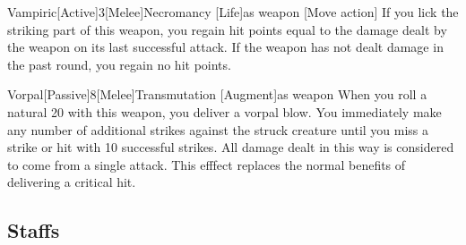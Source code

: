         \begin{magicitemdef}{Vampiric}[Active]{3}[Melee]{Necromancy [Life]}{as weapon}
            [Move action] If you lick the striking part of this weapon, you regain hit points equal to the damage dealt by the weapon on its last successful attack.
            If the weapon has not dealt damage in the past round, you regain no hit points.
        \end{magicitemdef}

        \begin{magicitemdef}{Vorpal}[Passive]{8}[Melee]{Transmutation [Augment]}{as weapon}
             When you roll a natural 20 with this weapon, you deliver a vorpal blow.
            You immediately make any number of additional strikes against the struck creature until you miss a strike or hit with 10 successful strikes.
            All damage dealt in this way is considered to come from a single attack.
            This efffect replaces the normal benefits of delivering a critical hit.
        \end{magicitemdef}

\begin{comment}
        \subsection{Rods}

            Rods are scepterlike devices that have unique magical powers and do not usually have charges.
            Anyone can use a rod.

            \parhead{Physical Description} Rods weigh approximately 5 pounds.

            They range from 2 feet to 3 feet long and are usually made of iron or some other metal.
            (Many, as noted in their descriptions, can function as light maces or clubs due to their sturdy construction.)

            These sturdy items have AC 9, 10 hit points, hardness 10, and a break DR of 27.

            \parhead{Activation} Details relating to rod use vary from item to item.
            See the individual descriptions for specifics.
\end{comment}

    \subsection{Staffs}

